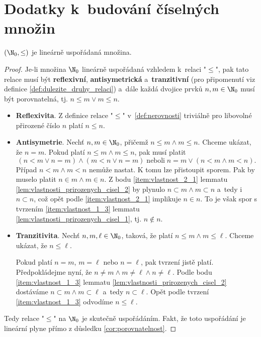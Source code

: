 \chapter{Dodatky k~budování číselných množin}\label{chap:dodatky_k_budovani_cis_mn}
\begin{theorem}
    $(\N_0,\leq)$ je lineárně uspořádaná množina.
\end{theorem}
\begin{proof}
    Je-li množina $\N_0$ lineárně uspořádaná vzhledem k~relaci "$\leq$", pak tato relace musí být \textbf{reflexivní}, \textbf{antisymetrická} a~\textbf{tranzitivní} (pro připomenutí viz definice \ref{def:dulezite_druhy_relaci}) a~dále každá dvojice prvků $n,m\in\N_0$ musí být porovnatelná, tj. $n\leq m\lor m\leq n$.
    \begin{itemize}
        \item \textbf{Reflexivita}. Z definice relace "$\leq$" v~\ref{def:nerovnosti} triviálně pro libovolné přirozené číslo $n$ platí $n\leq n$.
        \item \textbf{Antisymetrie}. Nechť $n,m\in\N_0$, přičemž $n\leq m \land m\leq n$. Chceme ukázat, že $n=m$. Pokud platí $n\leq m \land m\leq n$, pak musí platit
        \begin{equation*}
            (n<m\lor n=m) \land (m<n\lor n=m)\;\text{neboli}\;n=m\lor (n<m\land m<n).
        \end{equation*}
        Případ $n<m\land m<n$ nemůže nastat. K tomu lze přistoupit sporem. Pak by muselo platit $n\in m\land m\in n$. Z bodu \ref{item:vlastnost_2_1} lemmatu \ref{lem:vlastnosti_prirozenych_cisel_2} by plynulo $n\subset m\land m\subset n$ a~tedy i~$n\subset n$, což opět podle \ref{item:vlastnost_2_1} implikuje $n\in n$. To je však spor s tvrzením \ref{item:vlastnost_1_3} lemmatu \ref{lem:vlastnosti_prirozenych_cisel_1}, tj. $n\notin n$.
        \item \textbf{Tranzitivita}. Nechť $n,m,\ell\in\N_0$, taková, že platí $n\leq m \land m\leq\ell$. Chceme ukázat, že $n\leq\ell$.\par
        Pokud platí $n=m$, $m=\ell$ nebo $n=\ell$, pak tvrzení jistě platí. Předpokládejme nyní, že $n\neq m\land m\neq\ell\land n\neq\ell$. Podle bodu \ref{item:vlastnost_1_3} lemmatu \ref{lem:vlastnosti_prirozenych_cisel_2} dostáváme $n\subset m\land m\subset\ell$ a~tedy $n\subset\ell$. Opět podle tvrzení \ref{item:vlastnost_1_3} odvodíme $n\leq\ell$.
    \end{itemize}
    Tedy relace "$\leq$" na $\N_0$ je skutečně uspořádáním. Fakt, že toto uspořádání je lineární plyne přímo z důsledku \ref{cor:porovnatelnost}.
\end{proof}